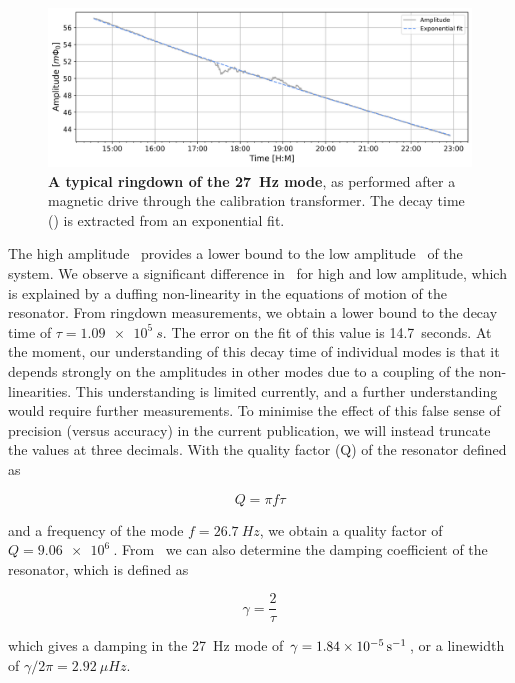\begin{appendices}
\begin{figure}[ht]%
\centering
\includegraphics[width=\textwidth]{Appenidx/paper_ringdown_amp.png}%
\caption{\textbf{A typical ringdown of the \SI{27}{Hz} mode}, as performed after a magnetic drive through the calibration transformer. The decay time (\texttau) is extracted from an exponential fit.}\label{fig_supp:ringdown}
\end{figure}

The high amplitude \texttau\ provides a lower bound to the low amplitude \texttau\ of the system. We observe a significant difference in \texttau\ for high and low amplitude, which is explained by a duffing non-linearity in the equations of motion of the resonator. From ringdown measurements, we obtain a lower bound to the decay time of $\tau = \SI{1.09e5}{s}$. The error on the fit of this value is \SI{14.7}{seconds}. At the moment, our understanding of this decay time of individual modes is that it depends strongly on the amplitudes in other modes due to a coupling of the non-linearities. This understanding is limited currently, and a further understanding would require further measurements. To minimise the effect of this false sense of precision (versus accuracy) in the current publication, we will instead truncate the values at three decimals.
With the quality factor (Q) of the resonator defined as

    \begin{equation}
        Q = \pi f \tau 
    \end{equation}

and a frequency of the mode $f = \SI{26.7}{Hz}$, we obtain a quality factor of $Q = \SI{9.06e6}{}$. From \texttau\ we can also determine the damping coefficient of the resonator, which is defined as 

    \begin{equation}
        \gamma = \frac{2}{\tau}
    \end{equation}


which gives a damping in the \SI{27}{Hz} mode of $\gamma = \SI{1.84e{-5}}{s^{-1}}$, or a linewidth of $\gamma/2\pi = \SI{2.92}{\mu Hz}$.


\end{appendices}
